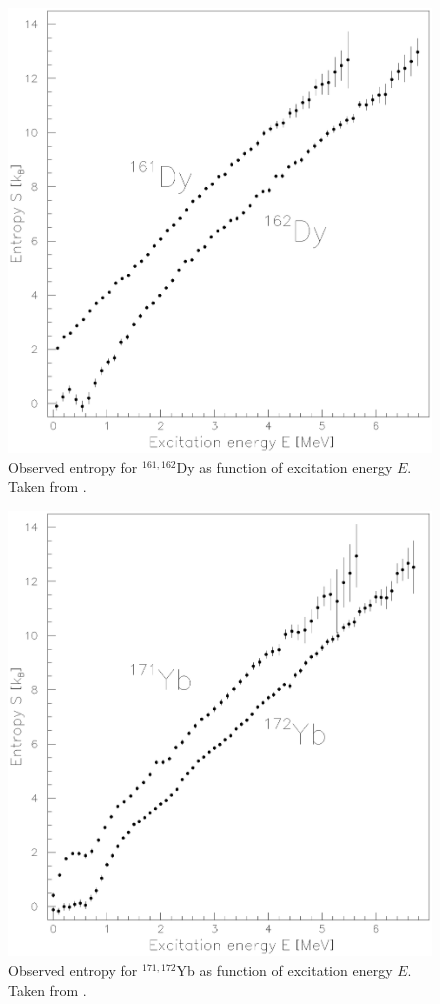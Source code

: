 \documentclass[rmp,aps,floatfix]{revtex4}
\begin{document}
\begin{figure}
\includegraphics[totalheight=12cm,angle=0,bb=0 20 350 730]{dean_hjorthjensen_fig26.ps}
\caption{Observed entropy for $^{161,162}$Dy as 
function of excitation energy $E$. Taken from \cite{entropy2000}.}
\label{fig:fig7_sec3}
\end{figure}
\begin{figure}
\includegraphics[totalheight=12cm,angle=0,bb=0 20 350 730]{dean_hjorthjensen_fig27.ps}
\caption{Observed entropy for $^{171,172}$Yb as function 
of excitation energy $E$. Taken from \cite{entropy2000}.}
\label{fig:fig8_sec3}
\end{figure}
\end{document}
